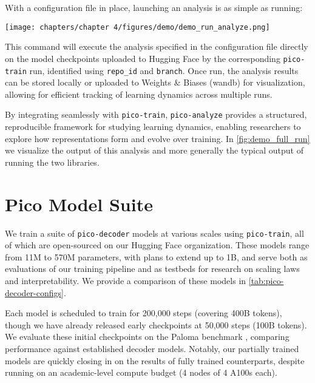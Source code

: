 With a configuration file in place, launching an analysis is as simple as running:

\begin{center}
    \texttt{[image: chapters/chapter 4/figures/demo/demo\_run\_analyze.png]}
\end{center}

This command will execute the analysis specified in the configuration file directly on the model checkpoints uploaded to Hugging Face by the corresponding \texttt{pico-train} run, identified using \verb|repo_id| and \verb|branch|. Once run, the analysis results can be stored locally or uploaded to Weights \& Biases (wandb) \citep{wandb} for visualization, allowing for efficient tracking of learning dynamics across multiple runs.  

By integrating seamlessly with \texttt{pico-train}, \texttt{pico-analyze} provides a structured, reproducible framework for studying learning dynamics, enabling researchers to explore how representations form and evolve over training. In \cref{fig:demo_full_run} we visualize the output of this analysis and more generally the typical output of running the two libraries. 

\section{Pico Model Suite}

We train a suite of \texttt{pico-decoder} models at various scales using \texttt{pico-train}, all of which are open-sourced on our Hugging Face organization. These models range from 11M to 570M parameters, with plans to extend up to 1B, and serve both as evaluations of our training pipeline and as testbeds for research on scaling laws and interpretability. We provide a comparison of these models in \cref{tab:pico-decoder-configs}.

Each model is scheduled to train for 200,000 steps (covering 400B tokens), though we have already released early checkpoints at 50,000 steps (100B tokens). We evaluate these initial checkpoints on the Paloma benchmark \citep{magnusson2024paloma}, comparing performance against established decoder models. Notably, our partially trained models are quickly closing in on the results of fully trained counterparts, despite running on an academic-level compute budget (4 nodes of 4 A100s each).

